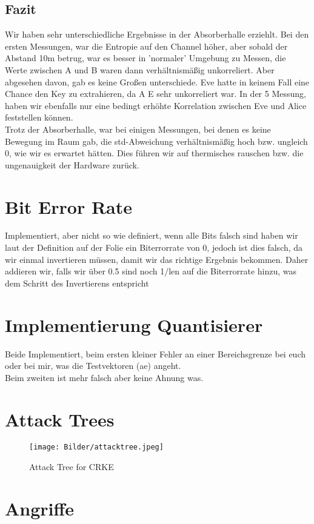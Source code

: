 \documentclass[12pt,a4paper]{article}
\begin{document}
\subsection*{Fazit}
Wir haben sehr unterschiedliche Ergebnisse in der Absorberhalle erziehlt. Bei den ersten Messungen, war die Entropie auf den Channel höher, aber sobald der Abstand 10m betrug, war es besser in 'normaler' Umgebung zu Messen, die Werte zwischen A und B waren dann verhältnismäßig unkorreliert. Aber abgesehen davon, gab es keine Großen unterschiede. Eve hatte in keinem Fall eine Chance den Key zu extrahieren, da A E sehr unkorreliert war. In der 5 Messung, haben wir ebenfalls nur eine bedingt erhöhte Korrelation zwischen Eve und Alice feststellen können.\\
Trotz der Absorberhalle, war bei einigen Messungen, bei denen es keine Bewegung im Raum gab, die std-Abweichung verhältnismäßig hoch bzw. ungleich 0, wie wir es erwartet hätten. Dies führen wir auf thermisches rauschen bzw. die ungenauigkeit der Hardware zurück.
\clearpage
\section{Bit Error Rate}
Implementiert, aber nicht so wie definiert, wenn alle Bits falsch sind haben wir laut der Definition auf der Folie ein Biterrorrate von 0, jedoch ist dies falsch, da wir einmal invertieren müssen, damit wir das richtige Ergebnis bekommen. Daher addieren wir, falls wir über 0.5 sind noch 1/len auf die Biterrorrate hinzu, was dem Schritt des Invertierens entspricht
\section{Implementierung Quantisierer}
Beide Implementiert, beim ersten kleiner Fehler an einer Bereichsgrenze bei euch oder bei mir, was die Testvektoren (ae) angeht.\\
Beim zweiten ist mehr falsch aber keine Ahnung was.
\section{Attack Trees}
\begin{figure}[H]
\centering
\texttt{[image: Bilder/attacktree.jpeg]}
\caption{Attack Tree for CRKE}
\label{test7}
\end{figure}
\section{Angriffe}
\end{document}
